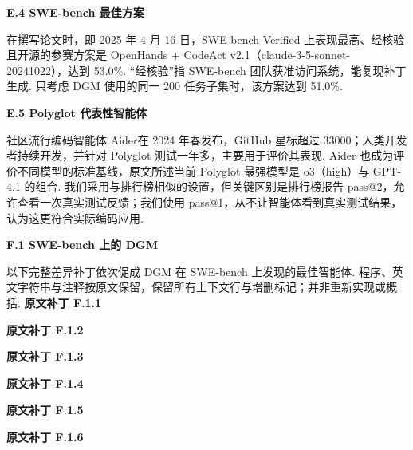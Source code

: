 \noindent\textbf{E.4 SWE-bench 最佳方案}\label{dgm-app:swebench-sota}\par
在撰写论文时，即 2025 年 4 月 16 日，SWE-bench Verified 上表现最高、经核验且开源的参赛方案是 OpenHands + CodeAct v2.1（claude-3-5-sonnet-20241022）\cite{dgm-wang2024openhands}，达到 53.0\%. “经核验”指 SWE-bench 团队获准访问系统，能复现补丁生成. 只考虑 DGM 使用的同一 200 任务子集时，该方案达到 51.0\%.

\noindent\textbf{E.5 Polyglot 代表性智能体}\label{dgm-app:polyglot-sota}\par
社区流行编码智能体 Aider\cite{dgm-aider2024}在 2024 年春发布，GitHub 星标超过 33000；人类开发者持续开发，并针对 Polyglot 测试一年多，主要用于评价其表现. Aider 也成为评价不同模型的标准基线，原文所述当前 Polyglot 最强模型是 o3（high）与 GPT-4.1 的组合. 我们采用与排行榜相似的设置，但关键区别是排行榜报告 pass@2，允许查看一次真实测试反馈；我们使用 pass@1，从不让智能体看到真实测试结果，认为这更符合实际编码应用.

\noindent\textbf{F.1 SWE-bench 上的 DGM}\label{dgm-app:best-agent-dgm}\par
以下完整差异补丁依次促成 DGM 在 SWE-bench 上发现的最佳智能体. 程序、英文字符串与注释按原文保留，保留所有上下文行与增删标记；并非重新实现或概括.
\noindent\textbf{原文补丁 F.1.1}\label{dgm-snippet-swe-diff0}\par
{}
\noindent\textbf{原文补丁 F.1.2}\label{dgm-snippet-swe-diff1}\par
{}
\noindent\textbf{原文补丁 F.1.3}\label{dgm-snippet-swe-diff2}\par
{}
\noindent\textbf{原文补丁 F.1.4}\label{dgm-snippet-swe-diff3}\par
{}
\noindent\textbf{原文补丁 F.1.5}\label{dgm-snippet-swe-diff4}\par
{}
\noindent\textbf{原文补丁 F.1.6}\label{dgm-snippet-swe-diff5}\par
{}

